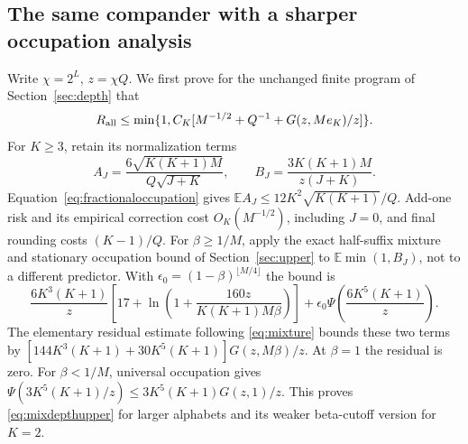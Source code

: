 \documentclass[11pt,letterpaper]{article}
\theoremstyle{definition}\newtheorem{definition}[theorem]{Definition}
\theoremstyle{remark}\newtheorem{remark}[theorem]{Remark}
\newcommand{\E}{\mathbb{E}}
\begin{document}
\subsection{The same compander with a sharper occupation analysis}
Write $\chi=2^L$, $z=\chi Q$. We first prove for the unchanged finite program of Section~\ref{sec:depth} that
\begin{equation}\label{eq:mixdepthupper}
 R_{\rm all}\le\min\{1,C_K[M^{-1/2}+Q^{-1}+G(z,Me_K)/z]\}.
\end{equation}
For $K\ge3$, retain its normalization terms
\[
 A_J=\frac{6\sqrt{K(K+1)M}}{Q\sqrt{J+K}},\qquad
 B_J=\frac{3K(K+1)M}{z(J+K)}.
\]
Equation~\eqref{eq:fractionaloccupation} gives
$\E A_J\le12K^2\sqrt{K(K+1)}/Q$. Add-one risk and its empirical correction cost $O_K(M^{-1/2})$, including $J=0$, and final rounding costs $(K-1)/Q$.
For $\beta\ge1/M$, apply the exact half-suffix mixture and stationary occupation bound of Section~\ref{sec:upper} to $\E\min(1,B_J)$, not to a different predictor. With $\epsilon_0=(1-\beta)^{\lfloor M/4\rfloor}$ the bound is
\[
 \frac{6K^3(K+1)}z
 \left[17+\ln\left(1+\frac{160z}{K(K+1)M\beta}\right)\right]
 +\epsilon_0\Psi\left(\frac{6K^5(K+1)}z\right).
\]
The elementary residual estimate following \eqref{eq:mixture} bounds these two terms by
$[144K^3(K+1)+30K^5(K+1)]G(z,M\beta)/z$.
At $\beta=1$ the residual is zero. For $\beta<1/M$, universal occupation gives
$\Psi(3K^5(K+1)/z)\le3K^5(K+1)G(z,1)/z$.
This proves \eqref{eq:mixdepthupper} for larger alphabets and its weaker beta-cutoff version for $K=2$.
\end{document}
